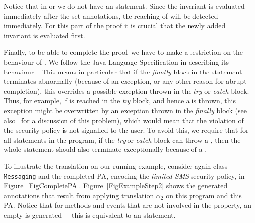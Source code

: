 Notice that in \postset or \excset we do not have an \Assert
statement. Since the invariant is evaluated immediately after the
set-annotations, the reaching of \halted will be detected
immediately. For this part of the proof it is crucial that
the newly added invariant is evaluated first.

Finally, to be able to complete the proof, we have to make a
restriction on the behaviour of \TryCatch. We follow the Java Language
Specification in describing its behaviour~\cite{GoslingJSB05}. This
means in particular that if the \emph{finally} block in the statement
terminates abnormally (because of an exception, or any other reason
for abrupt completion), this overrides a possible exception thrown in
the \emph{try} or \emph{catch} block. Thus, for example, if \halted
is reached in the \emph{try} block, and hence a \JMLExc is thrown, this
exception might be overwritten by an exception thrown in the
\emph{finally} block (see also~\cite{Huisman08} for a discussion of
this problem), which would mean that the violation of the security
policy is not signalled to the user. To avoid this, we require that
for all \TryCatch statements in the program, if the \emph{try} or
\emph{catch} block can throw a \JMLExc, then the whole statement
should also terminate exceptionally because of a \JMLExc.



To illustrate the translation on our running example, consider again
class \texttt{Messaging} and the completed
PA, encoding the \emph{limited SMS} security policy, in
Figure~\ref{FigCompletePA}. Figure~\ref{FigExampleStep2} shows the
generated annotations that result from applying translation
\(\alpha_2\) on this program and this PA. Notice that for methods 
and events that are not involved in the property, an empty \CaseJML is
generated~--~this is equivalent to an
\Skip statement.

